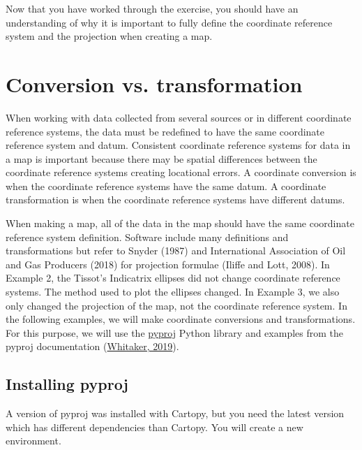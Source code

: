 \documentclass[a4paper , 12pt]{book}
\begin{document}
Now that you have worked through the exercise, you should have an understanding of why it is important to fully define the coordinate reference system and the projection when creating a map.

\section{Conversion vs. transformation}

When working with data collected from several sources or in different coordinate reference systems, the data must be redefined to have the same coordinate reference system and datum. Consistent coordinate reference systems for data in a map is important because there may be spatial differences between the coordinate reference systems creating locational errors. A coordinate conversion is when the coordinate reference systems have the same datum. A coordinate transformation is when the coordinate reference systems have different datums.

When making a map, all of the data in the map should have the same coordinate reference system definition. Software include many definitions and transformations but refer to Snyder (1987) and International Association of Oil and Gas Producers (2018) for projection formulae (Iliffe and Lott, 2008). In Example 2, the Tissot’s Indicatrix ellipses did not change coordinate reference systems. The method used to plot the ellipses changed. In Example 3, we also only changed the projection of the map, not the coordinate reference system. In the following examples, we will make coordinate conversions and transformations. For this purpose, we will use the \href{https://pypi.org/project/pyproj/}{pyproj} Python library and examples from the pyproj documentation (\href{https://pyproj4.github.io/pyproj/stable/api/transformer.html?highlight=transformer}{Whitaker, 2019}).

\subsection*{Installing pyproj}

A version of pyproj was installed with Cartopy, but you need the latest version which has different dependencies than Cartopy. You will create a new environment.
\end{document}

